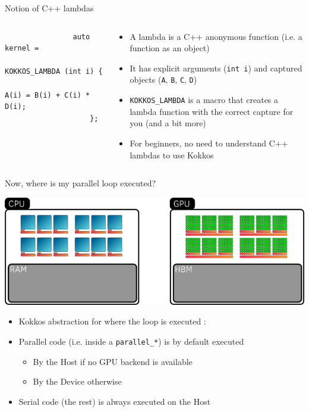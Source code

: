 \documentclass[
    aspectratio=169,
]{beamer}
\begin{document}
\begin{frame}[fragile]{Notion of C++ lambdas}
    \begin{columns}
        \begin{column}{0.5\linewidth}
            \begin{verbatim}
                auto kernel =
                    KOKKOS_LAMBDA (int i) {
                        A(i) = B(i) + C(i) * D(i);
                    };
            \end{verbatim}
        \end{column}
        \begin{column}{0.5\linewidth}
            \begin{itemize}
                \item A lambda is a C++ anonymous function (i.e. a function as an object)
                \item It has explicit arguments (\texttt{int i}) and captured objects (\texttt{A}, \texttt{B}, \texttt{C}, \texttt{D})
                \item \texttt{KOKKOS\_LAMBDA} is a macro that creates a lambda function with the correct capture for you (and a bit more)
                \item For beginners, no need to understand C++ lambdas to use Kokkos
            \end{itemize}
        \end{column}
    \end{columns}
\end{frame}


\begin{frame}{Now, where is my parallel loop executed?}
    \begin{center}
        \includegraphics[width=0.8\linewidth]{execution_space.png}
    \end{center}
    \begin{itemize}
        \item Kokkos abstraction for where the loop is executed : 
        \pause
        \item Parallel code (i.e. inside a \texttt{parallel\_*}) is by default executed
        \begin{itemize}
            \item By the Host if no GPU backend is available
            \item By the Device otherwise
        \end{itemize}
        \pause
        \item Serial code (the rest) is always executed on the Host
    \end{itemize}
\end{frame}
\end{document}
